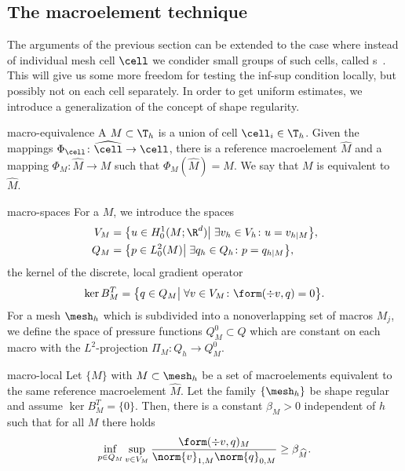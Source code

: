 \subsection{The macroelement technique}

\begin{intro}
  The arguments of the previous section can be extended to the case
  where instead of individual mesh cell $\cell$ we condider small
  groups of such cells, called
  s~\cite{Stenberg84}. This will give us some
  more freedom for testing the inf-sup condition locally, but possibly
  not on each cell separately. In order to get uniform estimates, we
  introduce a generalization of the concept of shape regularity.
\end{intro}

\begin{Definition}{macro-equivalence}
  A  $M\subset \T_h$ is a union of cell
  $\cell_i\in\T_h$. Given the mappings $\Phi_\cell\colon \widehat\cell \to
  \cell$, there is a reference macroelement $\widehat M$ and a mapping
  $\Phi_M\colon \widehat M\to M$ such that $\Phi_M(\widehat M) = M$. We say
  that $M$ is equivalent to $\widehat M$.
\end{Definition}

\begin{Definition}{macro-spaces}
  For a  $M$, we introduce the spaces
  \begin{align}
    \label{eq:macroelement:27}
    V_M &= \bigl\{ u\in H^1_0(M;\R^d) \big\vert
            \;\exists v_h\in V_h\colon u=v_{h|M}\bigr\},
    \\
    \label{eq:macroelement:28}
    Q_M &= \bigl\{ p\in L^2_0(M) \big\vert
            \;\exists q_h\in Q_h\colon p=q_{h|M}\bigr\},
  \end{align}
  the kernel of the discrete, local gradient operator
  \begin{gather}
    \label{eq:macroelement:29}
    \ker{B^T_M} = \bigl\{q\in Q_M \big\vert 
    \;\forall v\in V_M\colon \form(\div v,q) = 0\bigr\}.
  \end{gather}
  For a mesh $\mesh_h$ which is subdivided into a nonoverlapping set
  of macros $M_j$, we define the space of pressure functions
  $Q_M^0\subset Q$ which are constant on each macro with the
  $L^2$-projection $\Pi_M\colon Q_h\to Q_M^0$.
\end{Definition}

\begin{Lemma}{macro-local}
  Let $\{M\}$ with $M\subset \mesh_h$ be a set of macroelements
  equivalent to the same reference macroelement $\widehat M$. Let the
  family $\{\mesh_h\}$ be shape regular and assume
  $\ker{B^T_{M}} = \{0\}$. Then, there is a constant
  $\beta_M>0$ independent of $h$ such that for all $M$ there holds
  \begin{gather}
    \label{eq:macroelement:31}
    \inf_{p\in Q_M} \sup_{v\in V_M}
    \frac{\form(\div v,q)_M}{\norm{v}_{1,M}\norm{q}_{0,M}}
    \ge \beta_{\widehat M}.
  \end{gather}
\end{Lemma}

